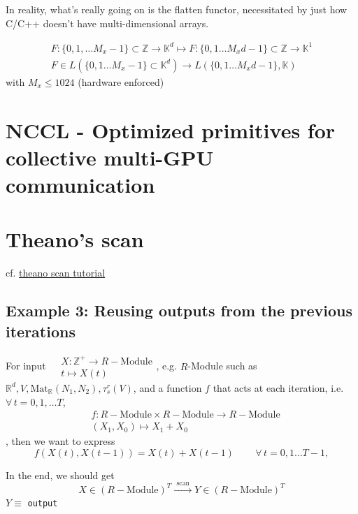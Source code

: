 \documentclass[10pt]{amsart}
\begin{document}
\begin{multicols*}{2}
In reality, what's really going on is the flatten functor, necessitated by just how C/C++ doesn't have multi-dimensional arrays.

\begin{equation}
\begin{gathered}
  F:\lbrace 0 ,1,\dots M_x - 1 \rbrace \subset \mathbb{Z} \to \mathbb{K}^d \mapsto F:\lbrace 0,1\dots M_xd-1\rbrace \subset \mathbb{Z} \to \mathbb{K}^1 \\
  F \in L(\lbrace0,1\dots M_x-1\rbrace \subset \mathbb{K}^d) \to L(\lbrace 0,1\dots M_xd-1\rbrace, \mathbb{K} )
  \end{gathered}
  \end{equation}
with $M_x\leq 1024$ (hardware enforced)

\section{NCCL - Optimized primitives for collective multi-GPU communication}

\section{Theano's scan}

cf. \href{https://nbviewer.jupyter.org/github/lamblin/ccw_tutorial/blob/master/Scan_W2016/scan_tutorial.ipynb}{theano scan tutorial}

\subsection{Example 3: Reusing outputs from the previous iterations}  

For input $\begin{aligned} & X:\mathbb{Z}^+ \to R-\text{Module}  \\
  & t\mapsto X(t) \end{aligned} $, e.g. $R$-Module such as $\mathbb{R}^d, V, \text{Mat}_{\mathbb{R}}(N_1,N_2), \tau_s^r(V)$, and a function $f$ that acts at each iteration, i.e. $\forall \, t=0,1,\dots T$, 
\[
\begin{aligned}
  & f: R-\text{Module} \times R-\text{Module} \to R-\text{Module} \\ 
  & (X_1,X_0) \mapsto X_1 + X_0 
  \end{aligned}
\], then we want to express
\[
f(X(t),X(t-1)) = X(t)+X(t-1) \qquad \, \forall \, t=0,1\dots T-1,
\]

In the end, we should get 
\[
X\in (R-\text{Module})^T \xrightarrow{ \text{ scan } } Y \in (R-\text{Module})^T
\]
$Y \equiv $ \verb|output|


\end{multicols*}
\end{document}
